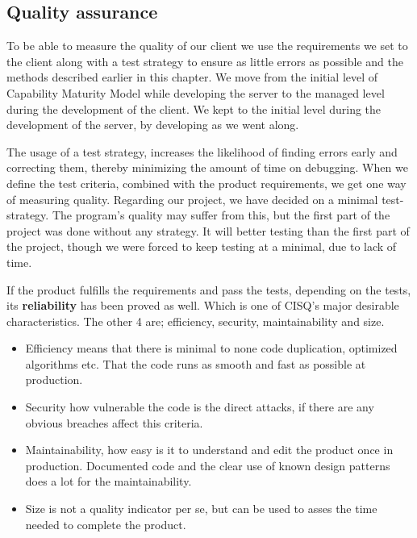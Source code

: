 \subsection{Quality assurance}
To be able to measure the quality of our client we use the requirements we set to the client along with a test strategy to ensure as little errors as possible and the methods described earlier in this chapter. We move from the initial level of Capability Maturity Model while developing the server to the managed level during the development of the client. We kept to the initial level during the development of the server, by developing as we went along.

The usage of a test strategy, increases the likelihood of finding errors early and correcting them, thereby minimizing the amount of time on debugging. When we define the test criteria, combined with the product requirements, we get one way of measuring quality.
Regarding our project, we have decided on a minimal test-strategy. The program's quality may suffer from this, but the first part of the project was done without any strategy. It will better testing than the first part of the project, though we were forced to keep testing at a minimal, due to lack of time.

 If the product fulfills the requirements and pass the tests, depending on the tests, its \textbf{reliability} has been proved as well. Which is one of CISQ's  major desirable characteristics. The other 4 are; efficiency, security, maintainability and size.
 \begin{itemize}
 	\item Efficiency means that there is minimal to none code duplication, optimized algorithms etc. That the code runs as smooth and fast as possible at production.
 	\item Security how vulnerable the code is the direct attacks, if there are any obvious breaches affect this criteria.
 	\item Maintainability, how easy is it to understand and edit the product once in production. Documented code and the clear use of known design patterns does a lot for the maintainability. 
 	 \item Size is not a quality indicator per se, but can be used to asses the time needed to complete the product.  
 \end{itemize} 
 
